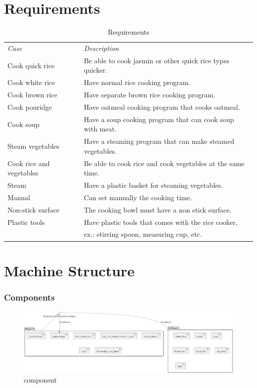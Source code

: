 \documentclass{scrartcl}
\begin{document}
\newpage

\section{Requirements}
\begin{table}[H] \centering
    \caption{Requirements}\label{tab:requirementstable}
    \begin{tabular}{@{}ll@{}} \hline
        \emph{Case} & \emph{Description}\\
        Cook quick rice & Be able to cook jasmin or other quick rice types quicker.\\
        Cook white rice & Have normal rice cooking program. \\
        Cook brown rice & Have separate brown rice cooking program.\\
        Cook pouridge & Have oatmeal cooking program that cooks oatmeal.\\
        Cook soup & Have a soup cooking program that can cook soup with meat.\\
        Steam vegetables & Have a steaming program that can make steamed vegetables.\\
        Cook rice and vegetables & Be able to cook rice and cook vegetables at the same time.\\
        Steam & Have a plastic basket for steaming vegetables.\\
        Manual & Can set manually the cooking time.\\ 
        Non-stick surface & The cooking bowl must have a non stick surface.\\
        Plastic tools & Have plastic tools that comes with the rice cooker,\\ & ex.: stirring spoon, measuring cup, etc.
    \end{tabular}
\end{table}

\section{Machine Structure}
\subsubsection{Components}
\begin{figure}[H]\centering
    \includegraphics[width=1.2\columnwidth]{Component.png}
    \caption{component}\label{fig:2}
\end{figure}
\end{document}
